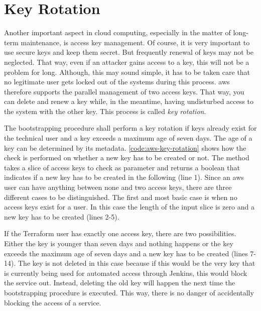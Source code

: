 


\section{Key Rotation}
Another important aspect in cloud computing, especially in the matter of long-term maintenance, is access key management.
Of course, it is very important to use secure keys and keep them secret.
But frequently renewal of keys may not be neglected.
That way, even if an attacker gains access to a key, this will not be a problem for long.
Although, this may sound simple, it has to be taken care that no legitimate user gets locked out of the systems during this process.
\ac{aws} therefore supports the parallel management of two access keys.
That way, you can delete and renew a key while, in the meantime, having undisturbed access to the system with the other key.
This process is called \emph{key rotation}.

The bootstrapping procedure shall perform a key rotation if keys already exist for the technical user and a key exceeds a maximum age of seven days.
The age of a key can be determined by its metadata.
\autoref{code:aws-key-rotation} shows how the check is performed on whether a new key has to be created or not.
The method takes a slice of access keys to check as parameter and returns a boolean that indicates if a new key has to be created in the following (line 1).
Since an \ac{aws} user can have anything between none and two access keys, there are three different cases to be distinguished.
The first and most basic case is when no access keys exist for a user.
In this case the length of the input slice is zero and a new key has to be created (lines 2-5).

If the Terraform user has exactly one access key, there are two possibilities.
Either the key is younger than seven days and nothing happens or the key exceeds the maximum age of seven days and a new key has to be created (lines 7-14).
The key is not deleted in this case because if this would be the very key that is currently being used for automated access through Jenkins, this would block the service out.
Instead, deleting the old key will happen the next time the bootstrapping procedure is executed.
This way, there is no danger of accidentally blocking the access of a service.

